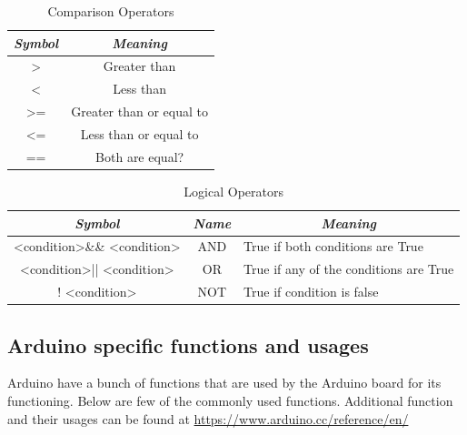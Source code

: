 \begin{itemize}
    \begin{table}
        \centering
        \renewcommand{\arraystretch}{1.5}
        \begin{tabular}{|c|c|}
        \hline
            \textit{\textbf{Symbol}} & \textit{\textbf{Meaning}} \\ \hline
            > & Greater than \\ \hline
            < & Less than \\ \hline
            >= & Greater than or equal to \\ \hline
            <= & Less than or equal to \\ \hline
            == & Both are equal? \\ \hline
        \end{tabular}
        \caption{Comparison Operators}
        \label{tab:comparision}
    \end{table}
    
    \begin{table}
        \renewcommand{\arraystretch}{1.5}
        \begin{tabular}{|c|c|l|}
            \hline
            \textit{\textbf{Symbol}}                                                 & \textit{\textbf{Name}} & \multicolumn{1}{c|}{\textit{\textbf{Meaning}}} \\ \hline
            \textless{}condition\textgreater \&\& \textless{}condition\textgreater{} & AND                    & True if both conditions are True               \\ \hline
            \textless{}condition\textgreater || \textless{}condition\textgreater{}   & OR                     & True if any of the conditions are True         \\ \hline
            ! \textless{}condition\textgreater{} & NOT & True if condition is false \\ \hline
        \end{tabular}
        \vspace{3mm}
        \caption{Logical Operators}
        \label{tab:logical}
    \end{table}

\end{itemize}

\subsection{Arduino specific functions and usages}
\par Arduino have a bunch of functions that are used by the Arduino board for its functioning. Below are few of the commonly used functions. Additional function and their usages can be found at \url{https://www.arduino.cc/reference/en/}

